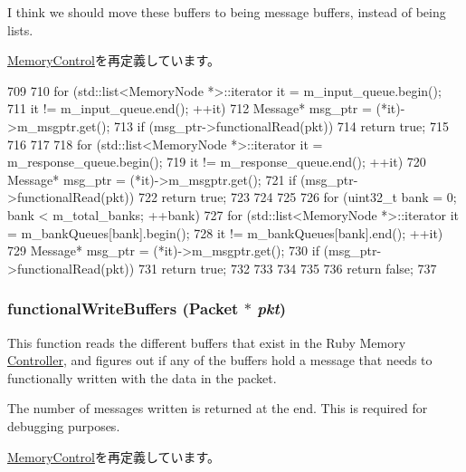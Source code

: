 I think we should move these buffers to being message buffers, instead of being lists. 

\hyperlink{classMemoryControl_ad587c16967cd8dc8b1dcb52a1ce0002b}{MemoryControl}を再定義しています。


\begin{DoxyCode}
709 {
710     for (std::list<MemoryNode *>::iterator it = m_input_queue.begin();
711          it != m_input_queue.end(); ++it) {
712         Message* msg_ptr = (*it)->m_msgptr.get();
713         if (msg_ptr->functionalRead(pkt)) {
714             return true;
715         }
716     }
717 
718     for (std::list<MemoryNode *>::iterator it = m_response_queue.begin();
719          it != m_response_queue.end(); ++it) {
720         Message* msg_ptr = (*it)->m_msgptr.get();
721         if (msg_ptr->functionalRead(pkt)) {
722             return true;
723         }
724     }
725 
726     for (uint32_t bank = 0; bank < m_total_banks; ++bank) {
727         for (std::list<MemoryNode *>::iterator it = m_bankQueues[bank].begin();
728              it != m_bankQueues[bank].end(); ++it) {
729             Message* msg_ptr = (*it)->m_msgptr.get();
730             if (msg_ptr->functionalRead(pkt)) {
731                 return true;
732             }
733         }
734     }
735 
736     return false;
737 }
\end{DoxyCode}
\hypertarget{classRubyMemoryControl_a08f04f912fb872935cb2d40f8570c340}{
\subsubsection[{functionalWriteBuffers}]{ functionalWriteBuffers ({\bf Packet} $\ast$ {\em pkt})}}
\label{classRubyMemoryControl_a08f04f912fb872935cb2d40f8570c340}
This function reads the different buffers that exist in the Ruby Memory \hyperlink{namespaceController}{Controller}, and figures out if any of the buffers hold a message that needs to functionally written with the data in the packet.

The number of messages written is returned at the end. This is required for debugging purposes. 

\hyperlink{classMemoryControl_aa1cf5fd9152389ffd0e21700945a149d}{MemoryControl}を再定義しています。


